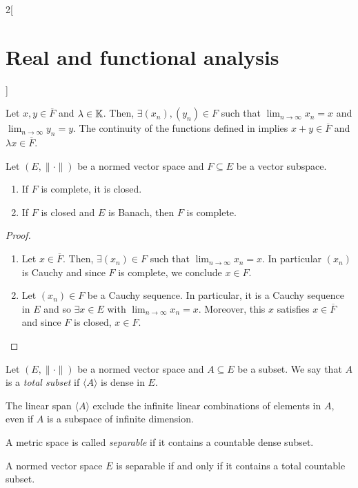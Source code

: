 \documentclass[../../../main_math.tex]{subfiles}
\begin{document}
\begin{multicols}{2}[\section{Real and functional analysis}]
\begin{proposition}
  \end{proposition}
  \begin{sproof}
    Let $x,y\in\overline{F}$ and $\lambda\in\mathbb{K}$. Then, $\exists(x_n),(y_n)\in F$ such that $\displaystyle \lim_{n\to\infty}x_n=x$ and $\displaystyle \lim_{n\to\infty}y_n=y$. The continuity of the functions defined in  implies $x+y\in\overline{F}$ and $\lambda x\in\overline{F}$.
  \end{sproof}
  \begin{proposition}
    Let $(E,\|\cdot\|)$ be a normed vector space and $F\subseteq E$ be a vector subspace.
    \begin{enumerate}
      \item If $F$ is complete, it is closed.
      \item If $F$ is closed and $E$ is Banach, then $F$ is complete.
    \end{enumerate}
  \end{proposition}
  \begin{proof}
    \begin{enumerate}
      \item Let $x\in\overline{F}$. Then, $\exists(x_n)\in F$ such that $\displaystyle \lim_{n\to\infty}x_n=x$. In particular $(x_n)$ is Cauchy and since $F$ is complete, we conclude $x\in F$.
      \item Let $(x_n)\in F$ be a Cauchy sequence. In particular, it is a Cauchy sequence in $E$ and so $\exists x\in E$ with $\displaystyle \lim_{n\to\infty}x_n=x$. Moreover, this $x$ satisfies $x\in \overline{F}$ and since $F$ is closed, $x\in F$.
    \end{enumerate}
  \end{proof}
  \begin{definition}
    Let $(E,\|\cdot\|)$ be a normed vector space and $A\subseteq E$ be a subset. We say that $A$ is a \emph{total subset} if $\langle A\rangle$ is dense in $E$.
  \end{definition}
  \begin{remark}
    The linear span $\langle A\rangle$ exclude the infinite linear combinations of elements in $A$, even if $A$ is a subspace of infinite dimension.
  \end{remark}
  \begin{definition}
    A metric space is called \emph{separable} if it contains a countable dense subset.
  \end{definition}
  \begin{proposition}
    A normed vector space $E$ is separable if and only if it contains a total countable subset.

\end{proposition}
\end{multicols}
\end{document}
